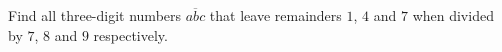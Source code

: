 Find all three-digit numbers $\overline{abc}$ that leave remainders $1$, $4$ and $7$ when divided by $7$, $8$ and $9$ respectively.

